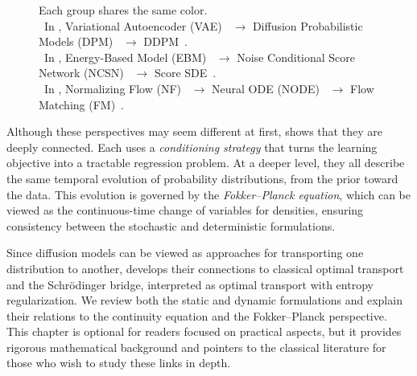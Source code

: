 \begin{figure}[th!]
{%
  }
  \caption{ Each group shares the same color. 
  \\
\sqbullet\ In , {Variational Autoencoder (VAE)}~\citep{kingma2013auto} $\to$ {Diffusion Probabilistic Models (DPM)}~\citep{sohl2015deep} $\to$ 
{DDPM}~\citep{ho2020denoising}. 
 \\
\sqbullet\ In , {Energy-Based Model (EBM)}~\citep{ackley1985learning} $\to$ {Noise Conditional Score Network (NCSN)}~\citep{song2019generative} $\to$ {Score SDE}~\citep{song2020score}.  \\
\sqbullet\
In , {Normalizing Flow (NF)}~\citep{rezende2015variational} $\to$ {Neural ODE (NODE)}~\citep{chen2018neural} $\to$ {Flow Matching (FM)}~\citep{lipman2022flow}.
\figcredit{Created by the authors.}}
  \label{fig:timeline-diffusion-perspectives-equal}
\end{figure}

Although these perspectives may seem different at first,  shows that they are deeply connected. 
Each uses a \emph{conditioning strategy} that turns the learning objective into a tractable regression problem. 
At a deeper level, they all describe the same temporal evolution of probability distributions, from the prior toward the data. 
This evolution is governed by the \emph{Fokker–Planck equation}, which can be viewed as the continuous-time change of variables for densities, ensuring consistency between the stochastic and deterministic formulations.

Since diffusion models can be viewed as approaches for transporting one distribution to another,  develops their connections to classical optimal transport and the Schrödinger bridge, interpreted as optimal transport with entropy regularization. We review both the static and dynamic formulations and explain their relations to the continuity equation and the Fokker--Planck perspective. This chapter is optional for readers focused on practical aspects, but it provides rigorous mathematical background and pointers to the classical literature for those who wish to study these links in depth. 


